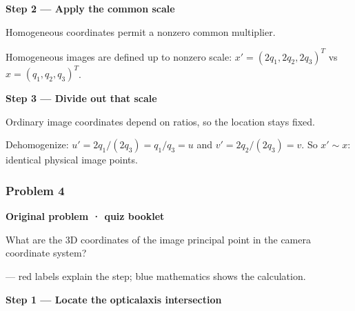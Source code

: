\documentclass[letterpaper,11pt,english,openany,oneside]{jupyterBook}
\begin{document}
\par

\par\medskip{}
{\color{QuizStepRed}\bfseries Step 2 — Apply the common scale}\par\smallskip

\sphinxAtStartPar
{} Homogeneous coordinates permit a nonzero common multiplier.

\sphinxAtStartPar
Homogeneous images are defined up to nonzero scale: {\color{QuizMathBlue} \(x'=(2q_1,2q_2,2q_3)^T\)} vs {\color{QuizMathBlue} \(x=(q_1,q_2,q_3)^T\)}.

\par

\par\medskip{}
{\color{QuizStepRed}\bfseries Step 3 — Divide out that scale}\par\smallskip

\sphinxAtStartPar
{} Ordinary image coordinates depend on ratios, so the location stays fixed.

\sphinxAtStartPar
Dehomogenize: {\color{QuizMathBlue} \(u'=2q_1/(2q_3)=q_1/q_3=u\)} and {\color{QuizMathBlue} \(v'=2q_2/(2q_3)=v\)}. So {\color{QuizMathBlue} \(\boxed{x'\sim x}\)}: identical physical image points.

\par


\subsubsection{Problem 4}
\label{\detokenize{lectures/lecture03/quiz-workbook:problem-4}}\label{\detokenize{lectures/lecture03/quiz-workbook:quiz-10-q4}}
\par\medskip\textbf{Original problem · quiz booklet}\par\smallskip

\sphinxAtStartPar
What are the 3D coordinates of the image principal point in the camera coordinate system?

\par\medskip

\sphinxAtStartPar
{} — red labels explain the step; blue mathematics shows the calculation.

\par\medskip{}
{\color{QuizStepRed}\bfseries Step 1 — Locate the optical\sphinxhyphen{}axis intersection}\par\smallskip
\end{document}
